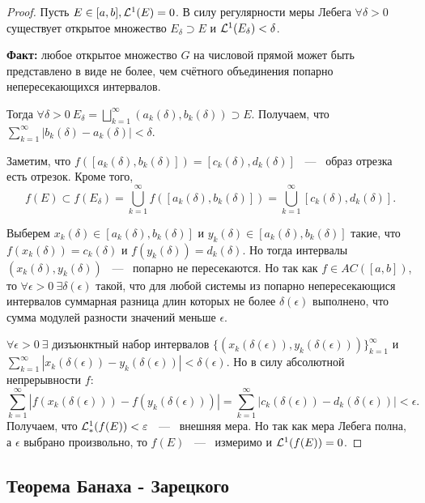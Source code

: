 \begin{proof}
    Пусть $E \in [a, b], \mathcal{L}^1(E) = 0$. В силу регулярности меры Лебега $\forall \delta > 0$ существует открытое множество $E_{\delta} \supset E$ и $\mathcal{L}^1(E_\delta) < \delta$. 

    \noindent \textbf{Факт:} любое открытое множество $G$ на числовой прямой может быть представлено в виде не более, чем счётного объединения попарно непересекающихся интервалов. 

    \noindent Тогда $\forall \delta > 0 \  E_{\delta} = \bigsqcup\limits_{k = 1}^{\infty} (a_k(\delta), b_k(\delta)) \supset E$. Получаем, что $\sum\limits_{k = 1}^{\infty} |b_k(\delta) - a_k(\delta)| < \delta$.

    \noindent Заметим, что $f([a_k(\delta), b_k(\delta)]) = [c_k(\delta), d_k(\delta)]$ ~---~ образ отрезка есть отрезок. Кроме того, $$f(E) \subset f(E_{\delta}) = \bigcup\limits_{k = 1}^{\infty} f([a_k(\delta), b_k(\delta)]) = \bigcup\limits_{k = 1}^{\infty} [c_k(\delta), d_k(\delta)].$$  

    \noindent Выберем $x_k(\delta) \in [a_k(\delta), b_k(\delta)]$ и $y_k(\delta) \in [a_k(\delta), b_k(\delta)]$ такие, что $f(x_k(\delta)) = c_k(\delta)$ и $f(y_k(\delta)) = d_k(\delta)$. Но тогда интервалы $(x_k(\delta), y_k(\delta))$ ~---~ попарно не пересекаются. Но так как $f \in AC([a, b])$, то $\forall \epsilon > 0 \ \exists \delta(\epsilon)$ такой, что для любой системы из попарно непересекающися интервалов суммарная разница длин которых не более $\delta(\epsilon)$ выполнено, что сумма модулей разности значений меньше $\epsilon$. 

     \noindent $\forall \epsilon > 0 \ \exists$ дизъюнктный набор интервалов $\{(x_k(\delta(\epsilon)), y_k(\delta(\epsilon)))\}_{k = 1}^{\infty}$ и $\sum\limits_{k = 1}^{\infty} \left|x_k(\delta(\epsilon)) - y_k(\delta(\epsilon))\right| < \delta(\epsilon)$. Но в силу абсолютной непрерывности $f$:  $$\sum\limits_{k = 1}^{\infty} |f(x_k(\delta(\epsilon))) - f(y_k(\delta(\epsilon)))| = \sum\limits_{k = 1}^{\infty} |c_k(\delta(\epsilon)) - d_k(\delta(\epsilon))| < \epsilon.$$ Получаем, что $\mathcal{L}^{1}_{*}(f(E)) < \varepsilon$ ~---~ внешняя мера. Но так как мера Лебега полна, а $\epsilon$ выбрано произвольно, то $f(E)$ ~---~ измеримо и $\mathcal{L}^1(f(E)) = 0$.  
\end{proof}

\subsection{Теорема Банаха - Зарецкого}

